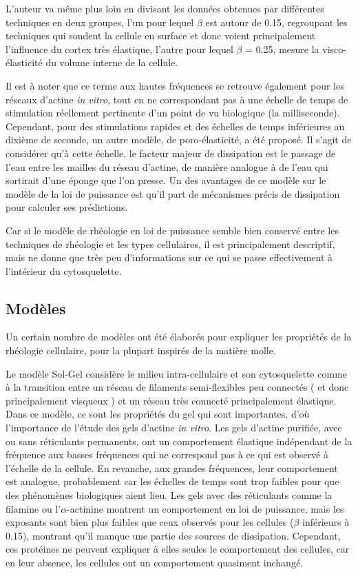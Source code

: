 \documentclass{report}
\begin{document}
L'auteur va même plus loin en divisant les données obtenues par différentes techniques en deux groupes, l'un pour lequel $\beta$ est autour de 0.15, regroupant les techniques qui sondent la cellule en surface et donc voient principalement l'influence du cortex très élastique, l'autre pour lequel $\beta$ = 0.25, mesure la visco-élasticité du volume interne de la cellule. 

Il est à noter que ce terme aux hautes fréquences se retrouve également pour les réseaux d'actine \textit{in vitro}, tout en ne correspondant pas à une échelle de temps de stimulation réellement pertinente d'un point de vu biologique (la milliseconde). 
Cependant, pour des stimulations rapides et des échelles de temps inférieures au dixième de seconde, un autre modèle, de poro-élasticité, a été proposé. 
Il s'agit de considérer qu'à cette échelle, le facteur majeur de dissipation est le passage de l'eau entre les mailles du réseau d'actine, de manière analogue à de l'eau qui sortirait d'une éponge que l'on presse.  
Un des avantages de ce modèle sur le modèle de la loi de puissance est qu'il part de mécanismes précis de dissipation pour calculer ses prédictions. 

Car si le modèle de rhéologie en loi de puissance semble bien conservé entre les techniques de rhéologie et les types cellulaires, il est principalement descriptif, mais ne donne que très peu d'informations sur ce qui se passe effectivement à l'intérieur du cytosquelette. 

\subsection{Modèles}

Un certain nombre de modèles ont été élaborés pour expliquer les propriétés de la rhéologie cellulaire, pour la plupart inspirés de la matière molle. 

Le modèle Sol-Gel considère le milieu intra-cellulaire et son cytosquelette comme à la transition entre un réseau de filaments semi-flexibles peu connectés ( et donc principalement visqueux ) et un réseau très connecté principalement élastique. 
Dans ce modèle, ce sont les propriétés du gel qui sont importantes,  d'où l'importance de l'étude des gels d'actine \textit{in vitro}. 
Les gels d'actine purifiée, avec ou sans réticulants permanents, ont un comportement élastique indépendant de la fréquence aux basses fréquences qui ne correspond pas à ce qui est observé à l'échelle de la cellule. En revanche, aux grandes fréquences, leur comportement est analogue, probablement car les échelles de temps sont trop faibles pour que des phénomènes biologiques aient lieu. 
Les gels avec des réticulants comme la filamine ou l'$\alpha$-actinine montrent un comportement en loi de puissance, mais les exposants sont bien plus faibles que ceux observés pour les cellules ($\beta$ inférieurs à 0.15), montrant qu'il manque une partie des sources de dissipation.
Cependant, ces protéines ne peuvent expliquer à elles seules le comportement des cellules, car en leur absence, les cellules ont un comportement quasiment inchangé. 
\end{document}
